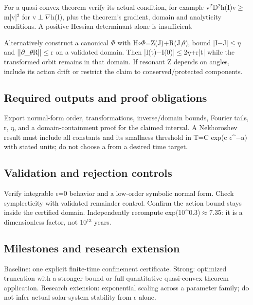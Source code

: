 \documentclass[
  11pt,
]{article}
\begin{document}
For a quasi-convex theorem verify its actual condition, for example
v\ensuremath{{}^{T}}D\ensuremath{{}^{2}}h(I)v\ensuremath{\ge}m|v|\ensuremath{{}^{2}}
for v\ensuremath{\perp}\ensuremath{\nabla}h(I), plus the theorem's
gradient, domain and analyticity conditions. A positive Hessian
determinant alone is insufficient.

Alternatively construct a canonical \ensuremath{\Phi} with
H\ensuremath{\circ}\ensuremath{\Phi}=Z(J)+R(J,\ensuremath{\theta}),
bound |I\ensuremath{-}J|\ensuremath{\le}\ensuremath{\eta} and
||\ensuremath{\partial}\_\ensuremath{\theta}R||\ensuremath{\le}r on a
validated domain. Then
|I(t)\ensuremath{-}I(0)|\ensuremath{\le}2\ensuremath{\eta}+r|t| while
the transformed orbit remains in that domain. If resonant Z depends on
angles, include its action drift or restrict the claim to
conserved/protected components.

\subsection{Required outputs and proof obligations}

Export normal-form order, transformations, inverse/domain bounds,
Fourier tails, r, \ensuremath{\eta}, and a domain-containment proof for
the claimed interval. A Nekhoroshev result must include all constants
and its smallness threshold in T=C exp(c
\ensuremath{\epsilon}\textasciicircum{}\ensuremath{-}a) with stated
units; do not choose a from a desired time target.

\subsection{Validation and rejection controls}

Verify integrable \ensuremath{\epsilon}=0 behavior and a low-order
symbolic normal form. Check symplecticity with validated remainder
control. Confirm the action bound stays inside the certified domain.
Independently recompute
exp(10\textasciicircum{}0.3)\ensuremath{\approx}7.35: it is a
dimensionless factor, not 10\ensuremath{{}^{13}} years.

\subsection{Milestones and research extension}

Baseline: one explicit finite-time confinement certificate. Strong:
optimized truncation with a stronger bound or full quantitative
quasi-convex theorem application. Research extension: exponential
scaling across a parameter family; do not infer actual solar-system
stability from \ensuremath{\epsilon} alone.
\end{document}
